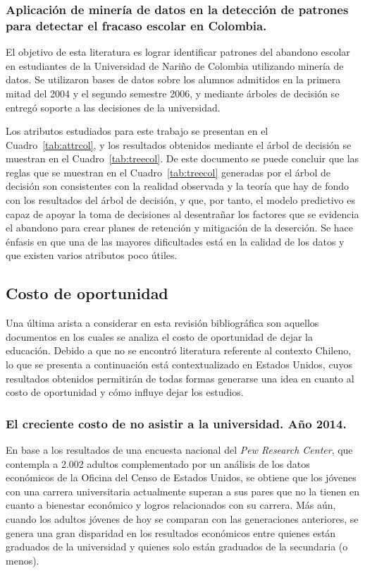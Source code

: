 \subsubsection{Aplicación de minería de datos en la detección de patrones para detectar el fracaso escolar en Colombia.}

El objetivo de esta literatura es lograr identificar patrones del abandono escolar en estudiantes de la Universidad de Nariño de Colombia utilizando minería de datos. Se utilizaron bases de datos sobre los alumnos admitidos en la primera mitad del 2004 y el segundo semestre 2006, y mediante árboles de decisión se entregó soporte a las decisiones de la universidad.

Los atributos estudiados para este trabajo se presentan en el Cuadro~\ref{tab:attrcol}, y los resultados obtenidos mediante el árbol de decisión se muestran en el Cuadro~\ref{tab:treecol}.
De este documento se puede concluir que las reglas que se muestran en el Cuadro~\ref{tab:treecol} generadas por el árbol de decisión son consistentes con la realidad observada y la teoría que hay de fondo con los resultados del árbol de decisión, y que, por tanto, el modelo predictivo es capaz de apoyar la toma de decisiones al desentrañar los factores que se evidencia el abandono para crear planes de retención y mitigación de la deserción. Se hace énfasis en que una de las mayores dificultades está en la calidad de los datos y que existen varios atributos poco útiles.

\subsection{Costo de oportunidad}
Una última arista a considerar en esta revisión bibliográfica son aquellos documentos en los cuales se analiza el costo de oportunidad de dejar la educación. Debido a que no se encontró literatura referente al contexto Chileno, lo que se presenta a continuación está contextualizado en Estados Unidos, cuyos resultados obtenidos permitirán de todas formas generarse una idea en cuanto al costo de oportunidad y cómo influye dejar los estudios.


\subsubsection{El creciente costo de no asistir a la universidad. Año 2014.}
En base a los resultados de una encuesta nacional del \textit{Pew Research Center}, que contempla a 2.002 adultos complementado por un análisis de los datos económicos de la Oficina del Censo de Estados Unidos, se obtiene que los jóvenes con una carrera universitaria actualmente superan a sus pares que no la tienen en cuanto a bienestar económico y logros relacionados con su carrera. Más aún, cuando los adultos jóvenes de hoy se comparan con las generaciones anteriores, se genera una gran disparidad en los resultados económicos entre quienes están graduados de la universidad y quienes solo están graduados de la secundaria (o menos). 

